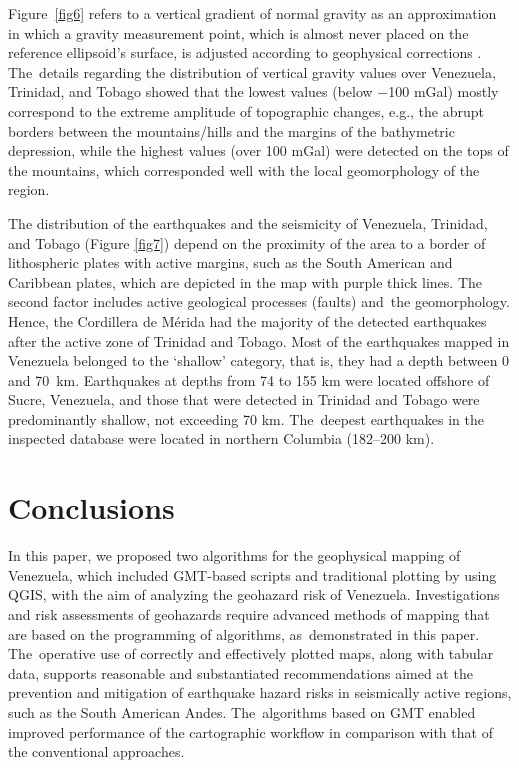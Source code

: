 \documentclass[sustainability,article,accept,pdftex,moreauthors]{Definitions/mdpi}
\begin{document}
Figure~\ref{fig6} refers to a vertical{ }gradient of normal gravity as an approximation in which a gravity measurement point, which is almost never placed on the reference ellipsoid’s surface{, }is adjusted according to geophysical corrections \citep{Li,Yilmaz}. The~details regarding the distribution of vertical gravity values over{ }Venezuela,  Trinidad, and Tobago showed that the lowest values (below $-$100 mGal) mostly correspond to the extreme amplitude of topographic changes{, e.g.,} the abrupt borders between the mountains/hills and the margins of the bathymetric depression{, }while the highest values (over 100 mGal) were detected on the tops of the mountains, {which }corresponded well{ }with the local geomorphology of the{ }region.

The distribution of the earthquakes and the seismicity of  Venezuela,  Trinidad, and Tobago (Figure \ref{fig7}) depend on the proximity of the area to a border of  lithospheric plates  with active margins{, }such as the South American and Caribbean plates{, }which are depicted in the map with purple thick lines{. }The second factor includes   active geological processes (faults) and~the geomorphology. Hence, the Cordillera de Mérida had the majority of the detected earthquakes after the active zone of  Trinidad and Tobago. {Most }of the earthquakes{ mapped in }Venezuela {belonged} to the  ‘shallow’ category, that is, they had a depth between 0 and \mbox{70 km.} Earthquakes at depths from 74 to 155 km were located offshore of  Sucre, Venezuela, and those that were detected in  Trinidad and Tobago were predominantly shallow{, }not exceeding 70 km. The~deepest earthquakes in the inspected database were located in  northern Columbia (182--200 km).

\section{Conclusions}

In this paper, we  proposed two algorithms for the geophysical mapping of Venezuela, which included {}GMT-based scripts and traditional plotting by using QGIS, with the aim of analyzing the geohazard risk  of Venezuela.  Investigations and risk assessments of geohazards require advanced methods of mapping that are based on the programming of algorithms, as~demonstrated in this paper. The~operative use of correctly and effectively plotted maps, along with tabular data, supports reasonable and substantiated %
 recommendations aimed at {the }prevention and mitigation of earthquake hazard risks in seismically active regions, such as the South American Andes. The~algorithms based on GMT enabled improved performance of the cartographic workflow {in comparison with that of the }conventional approaches{.} 
\end{document}
